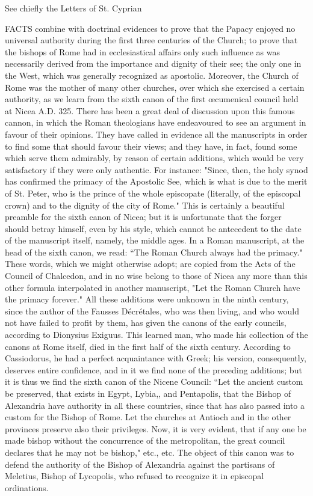 See chiefly the Letters of St. Cyprian


FACTS combine with doctrinal evidences to prove that the Papacy enjoyed no universal authority during the first three centuries of the Church; to prove that the bishops of Rome had in ecclesiastical affairs only such influence as was necessarily derived from the importance and dignity of their see; the only one in the West, which was generally recognized as apostolic. Moreover, the Church of Rome was the mother of many other churches, over which she exercised a certain authority, as we learn from the sixth canon of the first œcumenical council held at Nicea A.D. 325. There has been a great deal of discussion upon this famous cannon, in which the Roman theologians have endeavoured to see an argument in favour of their opinions. They have called in evidence all the manuscripts in order to find some that should favour their views; and they have, in fact, found some which serve them admirably, by reason of certain additions, which would be very satisfactory if they were only authentic. For instance: "Since, then, the holy synod has confirmed the primacy of the Apostolic See, which is what is due to the merit of St. Peter, who is the prince of the whole episcopate (literally, of the episcopal crown) and to the dignity of the city of Rome." This is certainly a beautiful preamble for the sixth canon of Nicea; but it is unfortunate that the forger should betray himself, even by his style, which cannot be antecedent to the date of the manuscript itself, namely, the middle ages. In a Roman manuscript, at the head of the sixth canon, we read: “The Roman Church always had the primacy." These words, which we might otherwise adopt; are copied from the Acts of the Council of Chalcedon, and in no wise belong to those of Nicea any more than this other formula interpolated in another manuscript, "Let the Roman Church have the primacy forever." All these additions were unknown in the ninth century, since the author of the Fausses Décrétales, who was then living, and who would not have failed to profit by them, has given the canons of the early councils, according to Dionysius Exiguus. This learned man, who made his collection of the canons at Rome itself, died in the first half of the sixth century. According to Cassiodorus, he had a perfect acquaintance with Greek; his version, consequently, deserves entire confidence, and in it we find none of the preceding additions; but it is thus we find the sixth canon of the Nicene Council: “Let the ancient custom be preserved, that exists in Egypt, Lybia,, and Pentapolis, that the Bishop of Alexandria have authority in all these countries, since that has also passed into a custom for the Bishop of Rome. Let the churches at Antioch and in the other provinces preserve also their privileges. Now, it is very evident, that if any one be made bishop without the concurrence of the metropolitan, the great council declares that he may not be bishop," etc., etc. The object of this canon was to defend the authority of the Bishop of Alexandria against the partisans of Meletius, Bishop of Lycopolis, who refused to recognize it in episcopal ordinations.


